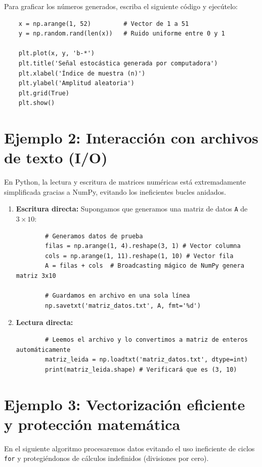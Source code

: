 \documentclass[11pt,a4paper,openany]{book}
\begin{document}
Para graficar los números generados, escriba el siguiente código y ejecútelo:
\begin{verbatim}
	x = np.arange(1, 52)         # Vector de 1 a 51
	y = np.random.rand(len(x))   # Ruido uniforme entre 0 y 1
	
	plt.plot(x, y, 'b-*')
	plt.title('Señal estocástica generada por computadora')
	plt.xlabel('Índice de muestra (n)')
	plt.ylabel('Amplitud aleatoria')
	plt.grid(True)
	plt.show()
\end{verbatim}

\section{Ejemplo 2: Interacción con archivos de texto (I/O)}

En Python, la lectura y escritura de matrices numéricas está extremadamente simplificada gracias a NumPy, evitando los ineficientes bucles anidados.

\begin{enumerate}
	\item \textbf{Escritura directa:} Supongamos que generamos una matriz de datos \texttt{A} de $3 \times 10$:
	\begin{verbatim}
		# Generamos datos de prueba
		filas = np.arange(1, 4).reshape(3, 1) # Vector columna
		cols = np.arange(1, 11).reshape(1, 10) # Vector fila
		A = filas + cols  # Broadcasting mágico de NumPy genera matriz 3x10
		
		# Guardamos en archivo en una sola línea
		np.savetxt('matriz_datos.txt', A, fmt='%d')
	\end{verbatim}
	
	\item \textbf{Lectura directa:}
	\begin{verbatim}
		# Leemos el archivo y lo convertimos a matriz de enteros automáticamente
		matriz_leida = np.loadtxt('matriz_datos.txt', dtype=int)
		print(matriz_leida.shape) # Verificará que es (3, 10)
	\end{verbatim}
\end{enumerate}

\section{Ejemplo 3: Vectorización eficiente y protección matemática}

En el siguiente algoritmo procesaremos datos evitando el uso ineficiente de ciclos \texttt{for} y protegiéndonos de cálculos indefinidos (divisiones por cero).
\end{document}
